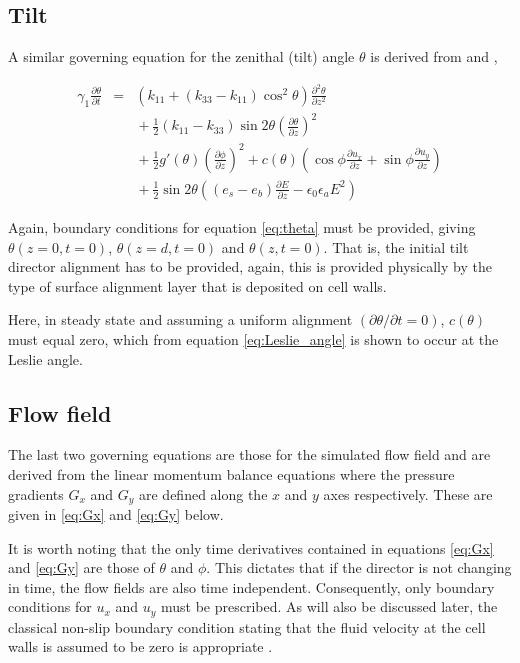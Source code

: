 \subsection{Tilt}
A similar governing equation for the zenithal (tilt) angle $\theta$ is derived from \cite{Cornford2008} and \cite{Stewart2004},

\begin{eqnarray}
\nonumber \gamma_1\frac{\partial\theta}{\partial t} & = & \left(k_{11}+\left(k_{33}-k_{11}\right)\cos^2\theta\right)\frac{\partial^2\theta}{\partial z^2}\\
\nonumber	& & {} + \frac{1}{2}\left(k_{11}-k_{33}\right)\sin2\theta\left(\frac{\partial\theta}{\partial z}\right)^2\\
\nonumber	& & {} + \frac{1}{2}g'\left(\theta\right)\left(\frac{\partial\phi}{\partial z}\right)^2+c\left(\theta\right)\left(\cos\phi\frac{\partial 							u_x}{\partial z}+\sin\phi\frac{\partial u_y}{\partial z}\right)\\
	& & {} + \frac{1}{2}\sin2\theta\left(\left(e_s-e_b\right)\frac{\partial E}{\partial z}-\epsilon_0\epsilon_aE^2\right)
	\label{eq:theta}
\end{eqnarray}

Again, boundary conditions for equation \ref{eq:theta} must be provided, giving $\theta\left(z=0,t=0\right)$, $\theta\left(z=d,t=0\right)$ and $\theta\left(z,t=0\right)$. That is, the initial tilt director alignment has to be provided, again, this is provided physically by the type of surface alignment layer that is deposited on cell walls.

Here, in steady state and assuming a uniform alignment $\left(\partial\theta / \partial t=0\right)$, $c\left(\theta\right)$ must equal zero, which from equation \ref{eq:Leslie_angle} is shown to occur at the Leslie angle.

\subsection{Flow field}
The last two governing equations are those for the simulated flow field and are derived from the linear momentum balance equations \cite{Cornford2008} where the pressure gradients $G_x$ and $G_y$ are defined along the $x$ and $y$ axes respectively. These are given in \ref{eq:Gx} and \ref{eq:Gy} below.

It is worth noting that the only time derivatives contained in equations \ref{eq:Gx} and \ref{eq:Gy} are those of $\theta$ and $\phi$. This dictates that if the director is not changing in time, the flow fields are also time independent. 
Consequently, only boundary conditions for $u_x$ and $u_y$ must be prescribed. As will also be discussed later, the classical non-slip boundary condition stating that the fluid velocity at the cell walls is assumed to be zero is appropriate \cite{Cornford2008,Feynmann1964}.



